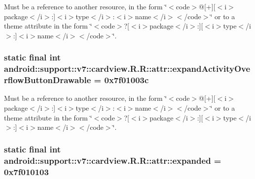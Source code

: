 Must be a reference to another resource, in the form \char`\"{}$<$code$>$@\mbox{[}+\mbox{]}\mbox{[}$<$i$>$package$<$/i$>$:\mbox{]}$<$i$>$type$<$/i$>$:$<$i$>$name$<$/i$>$$<$/code$>$\char`\"{} or to a theme attribute in the form \char`\"{}$<$code$>$?\mbox{[}$<$i$>$package$<$/i$>$:\mbox{]}\mbox{[}$<$i$>$type$<$/i$>$:\mbox{]}$<$i$>$name$<$/i$>$$<$/code$>$\char`\"{}. \hypertarget{classandroid_1_1support_1_1v7_1_1cardview_1_1_r_1_1attr_7a86cf8b5b3fd570cd7ed44cabffbc1d}{
\subsubsection[{expandActivityOverflowButtonDrawable}]{\setlength{\rightskip}{0pt plus 5cm}static final int android::support::v7::cardview.R.R::attr::expandActivityOverflowButtonDrawable = 0x7f01003c}}
\label{classandroid_1_1support_1_1v7_1_1cardview_1_1_r_1_1attr_7a86cf8b5b3fd570cd7ed44cabffbc1d}


Must be a reference to another resource, in the form \char`\"{}$<$code$>$@\mbox{[}+\mbox{]}\mbox{[}$<$i$>$package$<$/i$>$:\mbox{]}$<$i$>$type$<$/i$>$:$<$i$>$name$<$/i$>$$<$/code$>$\char`\"{} or to a theme attribute in the form \char`\"{}$<$code$>$?\mbox{[}$<$i$>$package$<$/i$>$:\mbox{]}\mbox{[}$<$i$>$type$<$/i$>$:\mbox{]}$<$i$>$name$<$/i$>$$<$/code$>$\char`\"{}. \hypertarget{classandroid_1_1support_1_1v7_1_1cardview_1_1_r_1_1attr_79e4daee784f83a51a7fd8f0648af403}{
\subsubsection[{expanded}]{\setlength{\rightskip}{0pt plus 5cm}static final int android::support::v7::cardview.R.R::attr::expanded = 0x7f010103}}
\label{classandroid_1_1support_1_1v7_1_1cardview_1_1_r_1_1attr_79e4daee784f83a51a7fd8f0648af403}


